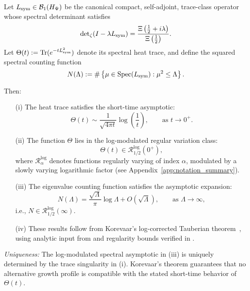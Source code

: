 \begin{lemma}
\label{lem:log_corrected_tauberian_estimate}
Let \( L_{\mathrm{sym}} \in \mathcal{B}_1(H_{\Psi}) \) be the canonical compact, self-adjoint, trace-class operator whose spectral determinant satisfies
\[
\det\nolimits_{\zeta}(I - \lambda L_{\mathrm{sym}}) = \frac{\Xi\left( \tfrac{1}{2} + i\lambda \right)}{\Xi\left( \tfrac{1}{2} \right)}.
\]
Let \( \Theta(t) := \operatorname{Tr}(e^{-t L_{\mathrm{sym}}^2}) \) denote its spectral heat trace, and define the squared spectral counting function
\[
N(\Lambda) := \#\left\{ \mu \in \operatorname{Spec}(L_{\mathrm{sym}}) : \mu^2 \le \Lambda \right\}.
\]

Then:

\begin{enumerate}
  \item[\textup{(i)}] The heat trace satisfies the short-time asymptotic:
  \[
  \Theta(t) \sim \frac{1}{\sqrt{4\pi t}} \log\left(\frac{1}{t}\right), \qquad \text{as } t \to 0^+.
  \]

  \item[\textup{(ii)}] The function \( \Theta \) lies in the log-modulated regular variation class:
  \[
  \Theta(t) \in \mathcal{R}_{1/2}^{\log}(0^+),
  \]
  where \( \mathcal{R}_{\alpha}^{\log} \) denotes functions regularly varying of index \( \alpha \), modulated by a slowly varying logarithmic factor (see Appendix~\ref{app:notation_summary}).

  \item[\textup{(iii)}] The eigenvalue counting function satisfies the asymptotic expansion:
  \[
  N(\Lambda) = \frac{\sqrt{\Lambda}}{\pi} \log \Lambda + O(\sqrt{\Lambda}),
  \qquad \text{as } \Lambda \to \infty,
  \]
  i.e., \( N \in \mathcal{R}_{1/2}^{\log}(\infty) \).

  \item[\textup{(iv)}] These results follow from Korevaar’s log-corrected Tauberian theorem~\cite[Ch.~III, §5]{Korevaar2004Tauberian}, using analytic input from  and regularity bounds verified in .
\end{enumerate}

\medskip

\noindent
\emph{Uniqueness:} The log-modulated spectral asymptotic in (iii) is uniquely determined by the trace singularity in (i). Korevaar’s theorem guarantees that no alternative growth profile is compatible with the stated short-time behavior of \( \Theta(t) \).
\end{lemma}
